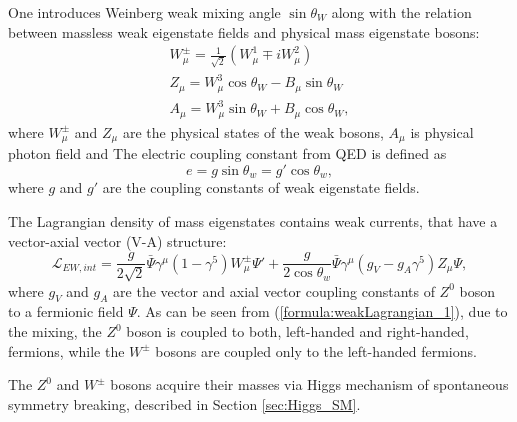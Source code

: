 One introduces Weinberg weak mixing angle $\sin\theta_W$ along with the relation between massless weak eigenstate fields and physical mass eigenstate bosons:
\begin{equation}
\begin{array}{l}
W^\pm_\mu = \frac{1}{\sqrt{2}}(W^1_\mu \mp iW^2_\mu )\\
Z_\mu = W^3_\mu \cos\theta_W - B_\mu \sin\theta_W\\
A_\mu = W^3_\mu \sin\theta_W + B_\mu \cos\theta_W,
\end{array}
\label{formula:ZWafterSB_1}
\end{equation}
where $W^\pm_\mu$ and $Z_\mu$ are the physical states of the weak bosons, $A_\mu$ is physical photon field and 
The electric coupling constant from QED is defined as 
\begin{equation}
e = g\sin\theta_w = g'\cos\theta_w,
\end{equation}
where $g$ and $g'$ are the coupling constants of weak eigenstate fields.

The Lagrangian density of mass eigenstates contains weak currents, that have a vector-axial vector (V-A) structure:
\begin{equation}
\mathcal{L}_{EW,int} = \frac{g}{2\sqrt{2}}\bar{\Psi}\gamma^\mu(1-\gamma^5)W^\pm_\mu\Psi' +\frac{g}{2\cos\theta_w} \bar{\Psi}\gamma^\mu(g_V-g_A\gamma^5)Z_\mu\Psi,
    \label{formula:weakLagrangian_1}
\end{equation}
where $g_V$ and $g_A$ are the vector and axial vector coupling constants of $Z^0$ boson to a fermionic field $\Psi$. 
As can be seen from (\ref{formula:weakLagrangian_1}), due to the mixing, the $Z^0$ boson is coupled to both, left-handed and right-handed, fermions, while the $W^\pm$ bosons are coupled only to the left-handed fermions.

The $Z^0$ and $W^\pm$ bosons acquire their masses via Higgs mechanism of spontaneous symmetry breaking, described in Section \ref{sec:Higgs_SM}.


